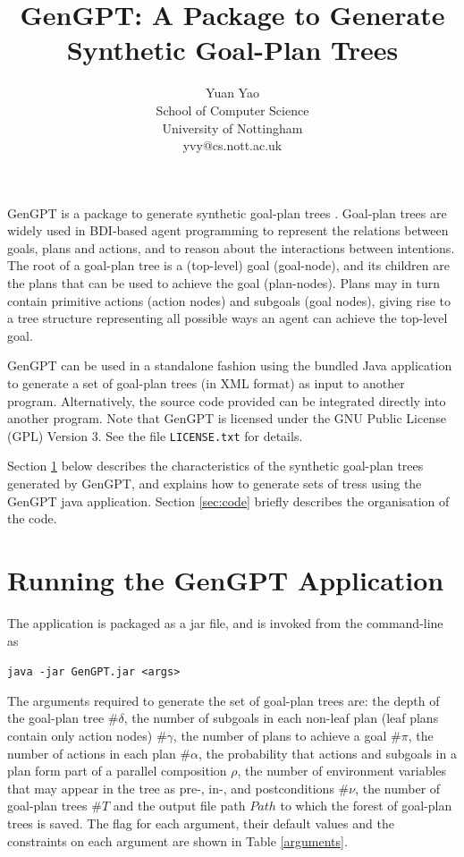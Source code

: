 \documentclass[11pt, a4paper]{article}
\title{\textbf{GenGPT: A Package to Generate Synthetic Goal-Plan Trees}}
\begin{document}
\author{Yuan Yao\\[5mm]
School of Computer Science\\
University of Nottingham\\
yvy@cs.nott.ac.uk}
\date{}
\maketitle

GenGPT is a package to generate synthetic goal-plan trees \cite{conf/ijcai/thangarajah03,journal/jar/thangarajah11}. Goal-plan trees are widely used in BDI-based agent programming to represent the relations between goals, plans and actions, and to reason about the interactions between intentions. The root of a goal-plan tree is a (top-level) goal (goal-node), and its children are the plans that can be used to achieve the goal (plan-nodes). Plans may in turn contain primitive actions (action nodes) and subgoals (goal nodes), giving rise to a tree structure representing all possible ways an agent can achieve the top-level goal. 

GenGPT can be used in a standalone fashion using the bundled Java application to generate a set of goal-plan trees (in XML format) as input to another program. Alternatively, the source code provided can be integrated directly into another program. Note that GenGPT is licensed under the GNU Public License (GPL) Version 3. See the file \texttt{LICENSE.txt} for details.

Section \ref{sec:running-GenGPT} below describes the  characteristics of the synthetic goal-plan trees generated by GenGPT, and explains how to generate sets of tress using the GenGPT java application. Section \ref{sec:code} briefly describes the organisation of the code.

\section{Running the GenGPT Application}
\label{sec:running-GenGPT}

The application is packaged as a jar file, and is invoked from the command-line as

\vspace{3mm}
\texttt{java -jar GenGPT.jar <args>}

\vspace{3mm}
The arguments required to generate the set of goal-plan trees are: the depth of the goal-plan tree $\#\delta$, the number of subgoals in each non-leaf plan (leaf plans contain only action nodes) $\#\gamma$, the number of plans to achieve a goal $\#\pi$, the number of actions in each plan $\#\alpha$, 
the probability that actions and subgoals in a plan form part of a parallel composition $\rho$, the number of environment variables that may appear in the tree as pre-, in-, and postconditions $\#\nu$, the number of goal-plan trees $\#T$ and the output file path $Path$ to which the forest of goal-plan trees is saved. The flag for each argument, their default values and the constraints on each argument are shown in Table \ref{arguments}.
\end{document}
